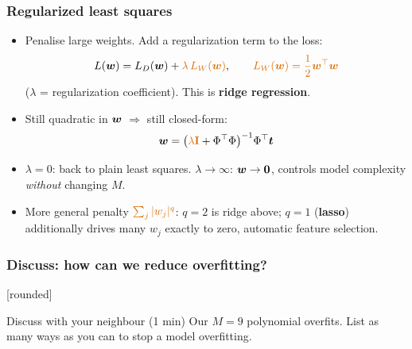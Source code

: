 \documentclass[10pt]{beamer}
\begin{document}
\begin{frame}[fragile]
\frametitle{Regularized least squares}

\begin{itemize}
\item Penalise large weights. Add a \textcolor{orange!85!black}{regularization term} to the
  loss:
\[
L(\bs{w}) = L_D(\bs{w}) + \textcolor{orange!85!black}{\lambda\, L_W(\bs{w})}, \qquad
\textcolor{orange!85!black}{L_W(\bs{w}) = \frac{1}{2}\bs{w}^\top\bs{w}}
\]
($\lambda$ = regularization coefficient). This is \textbf{ridge regression}.
\end{itemize}

\begin{itemize}
\item Still quadratic in $\boldsymbol{w}$ $\Rightarrow$ still closed-form:
\[
\bs{w} = \bigl(\textcolor{orange!85!black}{\lambda \mathbf{I}} + \Phi^\top\Phi\bigr)^{-1}\Phi^\top\bs{t}
\]
\item $\lambda{=}0$: back to plain least squares. $\lambda \to \infty$:
  $\boldsymbol{w}\to \mathbf{0}$, controls model complexity \emph{without}
  changing $M$.
\end{itemize}

\begin{itemize}
\item[$\Rightarrow$] More general penalty $\textcolor{orange!85!black}{\sum_j |w_j|^q}$: $q{=}2$ is ridge
  above; $q{=}1$ (\textbf{lasso}) additionally drives many $w_j$ exactly to
  zero, automatic feature selection.
\end{itemize}

\end{frame}
\begin{frame}[fragile]
\frametitle{Discuss: how can we reduce overfitting?}
[rounded]


\begin{block}{Discuss with your neighbour (1 min)}
Our $M{=}9$ polynomial overfits. List as many ways as you can to stop a
model overfitting.
\end{block}

\vspace{6pt}

\end{frame}
\end{document}
